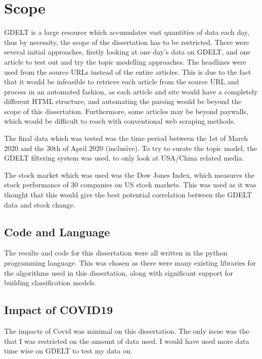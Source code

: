 \section{Scope}
\label{scope}
GDELT is a large resource which accumulates vast quantities of data each day, thus by necessity, the scope of the dissertation has to be restricted. There were several initial approaches, firstly looking at one day's data on GDELT, and one article to test out and try the topic modelling approaches. The headlines were used from the source URLs instead of the entire articles. This is due to the fact that it would be infeasible to retrieve each article from the source URL and process in an automated fashion, as each article and site would have a completely different HTML structure, and automating the parsing would be beyond the scope of this dissertation. Furthermore, some articles may be beyond paywalls, which would be difficult to reach with conventional web scraping methods.

The final data which was tested was the time period between the 1st of March 2020 and the 30th of April 2020 (inclusive). To try to curate the topic model, the GDELT filtering system was used, to only look at USA/China related media. 

The stock market which was used was the Dow Jones Index, which measures the stock performance of 30 companies on US stock markets. This was used as it was thought that this would give the best potential correlation between the GDELT data and stock change. 

\subsection{Code and Language}
The results and code for this dissertation were all written in the python programming language. This was chosen as there were many existing libraries for the algorithms used in this dissertation, along with significant support for building classification models.

\subsection{Impact of COVID19}
The impacts of Covid was minimal on this dissertation. The only issue was the that I was restricted on the amount of data used. I would have used more data time wise on GDELT to test my data on.